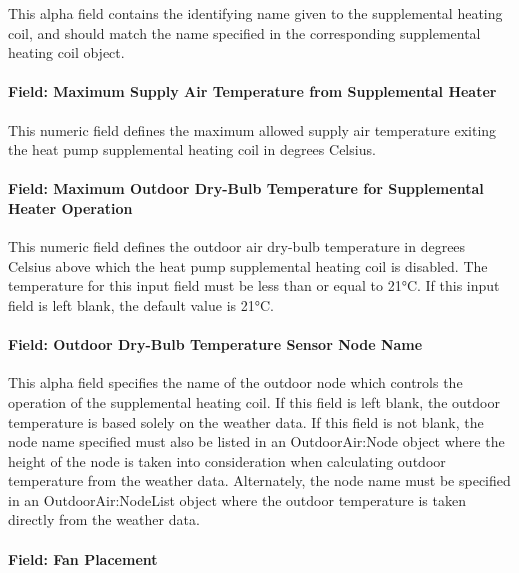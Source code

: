This alpha field contains the identifying name given to the supplemental heating coil, and should match the name specified in the corresponding supplemental heating coil object.

\paragraph{Field: Maximum Supply Air Temperature from Supplemental Heater}\label{field-maximum-supply-air-temperature-from-supplemental-heater-2}

This numeric field defines the maximum allowed supply air temperature exiting the heat pump supplemental heating coil in degrees Celsius.

\paragraph{Field: Maximum Outdoor Dry-Bulb Temperature for Supplemental Heater Operation}\label{field-maximum-outdoor-dry-bulb-temperature-for-supplemental-heater-operation-3}

This numeric field defines the outdoor air dry-bulb temperature in degrees Celsius above which the heat pump supplemental heating coil is disabled. The temperature for this input field must be less than or equal to 21°C. If this input field is left blank, the default value is 21°C.

\paragraph{Field: Outdoor Dry-Bulb Temperature Sensor Node Name}\label{field-outdoor-dry-bulb-temperature-sensor-node-name-1}

This alpha field specifies the name of the outdoor node which controls the operation of the supplemental heating coil. If this field is left blank, the outdoor temperature is based solely on the weather data. If this field is not blank, the node name specified must also be listed in an OutdoorAir:Node object where the height of the node is taken into consideration when calculating outdoor temperature from the weather data. Alternately, the node name must be specified in an OutdoorAir:NodeList object where the outdoor temperature is taken directly from the weather data.

\paragraph{Field: Fan Placement}\label{field-fan-placement-6}

